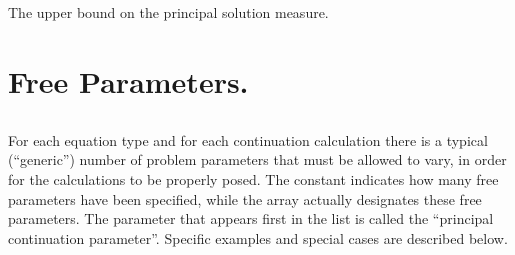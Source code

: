 \subsection{}  \label{sec:A1}


 The upper bound on the principal solution measure.

\section{ Free Parameters.} \label{sec:Free_parameters}


\subsection{}  \label{sec:ICP}




For each equation type and for each continuation calculation there is
a typical (``generic'') number of problem parameters that must be 
allowed to vary, in order for the calculations to be properly posed.
The constant  indicates how many free parameters have been specified,
while the array  actually designates these free parameters.
The parameter that appears first in the  list is called the 
``principal continuation parameter''.
Specific examples and special cases are described below.

